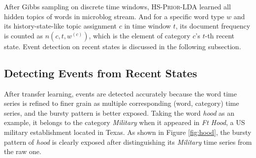 \documentclass[runningheads,a4paper]{llncs}
\begin{document}

After Gibbs sampling on discrete time windows, \textsc{HS-Prior-LDA} learned all hidden topics of words in microblog stream.
And for a specific word type \(w\) and its history-state-like topic assignment \(c\) in time window \(t\), its document frequency is counted as \(n(c,t,w^{(c)})\), which is the element of category \(c\)'s \(t\)-th recent state.
Event detection on recent states is discussed in the following subsection.

\subsection{Detecting Events from Recent States}
\label{subsec:detection}
After transfer learning, events are detected accurately because the word time series is refined to finer grain as multiple corresponding (word, category) time series, and the bursty pattern is better exposed. 
Taking the word \textit{hood} as an example, it belongs to the category \textit{Military} when it appeared in \textit{Ft Hood}, a US military establishment located in Texas.
As shown in Figure \ref{fig:hood}, the bursty pattern of \textit{hood} is clearly exposed after distinguishing its \textit{Military} time series from the raw one.
\end{document}
